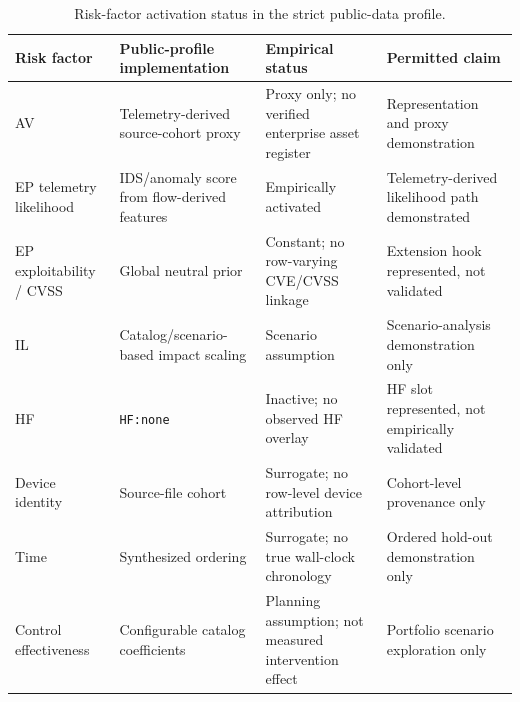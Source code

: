 \documentclass[preprint,12pt]{elsarticle}
\begin{document}
\begin{table}[t]
\centering
\caption{Risk-factor activation status in the strict public-data profile.}
\label{tab:risk_factor_activation}
\small
\setlength{\tabcolsep}{3pt}
\begin{tabularx}{\textwidth}{@{}p{}XXX@{}}
\toprule
Risk factor & Public-profile implementation & Empirical status & Permitted claim \\
\midrule
AV & Telemetry-derived source-cohort proxy & Proxy only; no verified enterprise asset register & Representation and proxy demonstration \\
EP telemetry likelihood & IDS/anomaly score from flow-derived features & Empirically activated & Telemetry-derived likelihood path demonstrated \\
EP exploitability / CVSS & Global neutral prior & Constant; no row-varying CVE/CVSS linkage & Extension hook represented, not validated \\
IL & Catalog/scenario-based impact scaling & Scenario assumption & Scenario-analysis demonstration only \\
HF & \texttt{HF:none} & Inactive; no observed HF overlay & HF slot represented, not empirically validated \\
Device identity & Source-file cohort & Surrogate; no row-level device attribution & Cohort-level provenance only \\
Time & Synthesized ordering & Surrogate; no true wall-clock chronology & Ordered hold-out demonstration only \\
Control effectiveness & Configurable catalog coefficients & Planning assumption; not measured intervention effect & Portfolio scenario exploration only \\
\bottomrule
\end{tabularx}
\end{table}
\end{document}
